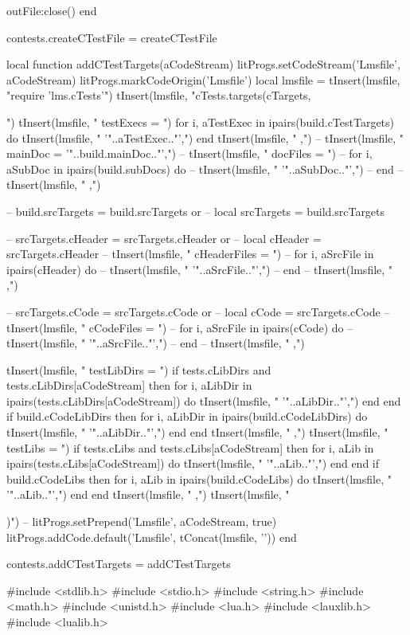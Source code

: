   outFile:close()
end

contests.createCTestFile = createCTestFile

local function addCTestTargets(aCodeStream)
  litProgs.setCodeStream('Lmsfile', aCodeStream)
  litProgs.markCodeOrigin('Lmsfile')
  local lmsfile = {}
  tInsert(lmsfile, "require 'lms.cTests'\n")
  tInsert(lmsfile, "cTests.targets(cTargets, {")
  tInsert(lmsfile, "  testExecs = {")
  for i, aTestExec in ipairs(build.cTestTargets) do
    tInsert(lmsfile, "    '"..aTestExec.."',")
  end
  tInsert(lmsfile, "  },")
--  tInsert(lmsfile, "  mainDoc = '"..build.mainDoc.."',")
--  tInsert(lmsfile, "  docFiles = {")
--  for i, aSubDoc in ipairs(build.subDocs) do
--    tInsert(lmsfile, "    '"..aSubDoc.."',")
--  end
--  tInsert(lmsfile, "  },")

--  build.srcTargets = build.srcTargets or { }
--  local srcTargets = build.srcTargets
  
--  srcTargets.cHeader = srcTargets.cHeader or { }
--  local cHeader      = srcTargets.cHeader
--  tInsert(lmsfile, "  cHeaderFiles = {")
--  for i, aSrcFile in ipairs(cHeader) do
--    tInsert(lmsfile, "    '"..aSrcFile.."',")
--  end
--  tInsert(lmsfile, "  },")
  
--  srcTargets.cCode = srcTargets.cCode or { }
--  local cCode      = srcTargets.cCode
--  tInsert(lmsfile, "  cCodeFiles = {")
--  for i, aSrcFile in ipairs(cCode) do
--    tInsert(lmsfile, "    '"..aSrcFile.."',")
--  end
--  tInsert(lmsfile, "  },")

  tInsert(lmsfile, "  testLibDirs = {")
  if tests.cLibDirs and tests.cLibDirs[aCodeStream] then
    for i, aLibDir in ipairs(tests.cLibDirs[aCodeStream]) do
      tInsert(lmsfile, "    '"..aLibDir.."',")
    end
  end
  if build.cCodeLibDirs then 
    for i, aLibDir in ipairs(build.cCodeLibDirs) do
      tInsert(lmsfile, "    '"..aLibDir.."',")
    end
  end
  tInsert(lmsfile, "  },")
  tInsert(lmsfile, "  testLibs = {")
  if tests.cLibs and tests.cLibs[aCodeStream] then
    for i, aLib in ipairs(tests.cLibs[aCodeStream]) do
      tInsert(lmsfile, "    '"..aLib.."',")
    end
  end
  if build.cCodeLibs then 
    for i, aLib in ipairs(build.cCodeLibs) do
      tInsert(lmsfile, "    '"..aLib.."',")
    end
  end
  tInsert(lmsfile, "  },")
  tInsert(lmsfile, "})")
--  litProgs.setPrepend('Lmsfile', aCodeStream, true)
  litProgs.addCode.default('Lmsfile', tConcat(lmsfile, '\n'))
end

contests.addCTestTargets = addCTestTargets
\stopLuaCode

\startCHeader
#include <stdlib.h>
#include <stdio.h>
#include <string.h>
#include <math.h>
#include <unistd.h>
#include <lua.h>
#include <lauxlib.h>
#include <lualib.h>

